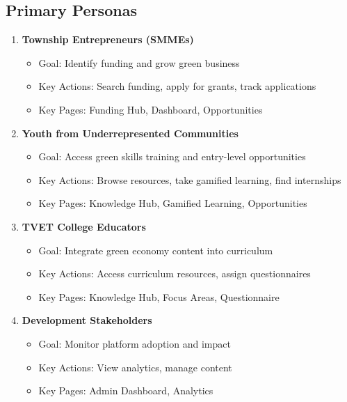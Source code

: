 \documentclass[a4paper,12pt]{article}
\begin{document}
\subsection{Primary Personas}
\begin{enumerate}
    \item \textbf{Township Entrepreneurs (SMMEs)}
        \begin{itemize}
            \item Goal: Identify funding and grow green business
            \item Key Actions: Search funding, apply for grants, track applications
            \item Key Pages: Funding Hub, Dashboard, Opportunities
        \end{itemize}
    
    \item \textbf{Youth from Underrepresented Communities}
        \begin{itemize}
            \item Goal: Access green skills training and entry-level opportunities
            \item Key Actions: Browse resources, take gamified learning, find internships
            \item Key Pages: Knowledge Hub, Gamified Learning, Opportunities
        \end{itemize}
    
    \item \textbf{TVET College Educators}
        \begin{itemize}
            \item Goal: Integrate green economy content into curriculum
            \item Key Actions: Access curriculum resources, assign questionnaires
            \item Key Pages: Knowledge Hub, Focus Areas, Questionnaire
        \end{itemize}
    
    \item \textbf{Development Stakeholders}
        \begin{itemize}
            \item Goal: Monitor platform adoption and impact
            \item Key Actions: View analytics, manage content
            \item Key Pages: Admin Dashboard, Analytics
        \end{itemize}
\end{enumerate}
\end{document}
